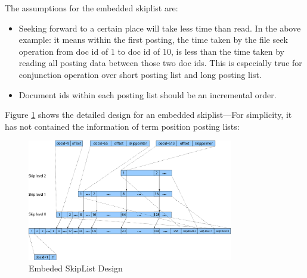 The assumptions for the embedded skiplist are:
\begin{itemize}
 \item Seeking forward to a certain place will take less time than read. In the above example: it means within the first posting, the time taken by the file seek operation from doc id of 1 to doc id of 10, is less than the time 
taken by reading all posting data between those two doc ids.  This is especially true for conjunction operation over short posting list and long posting list.
 \item Document ids within each posting list should be an incremental order. 
\end{itemize}

Figure \ref{skiplist} shows the detailed design for an embedded skiplist---For simplicity, it has not contained the information of term position posting lists:
\begin{figure}[h!]
\centerline{\includegraphics[width=0.8\textwidth]{Figures/skip.png}}
\caption{Embeded SkipList Design}\label{skiplist}
\end{figure}

